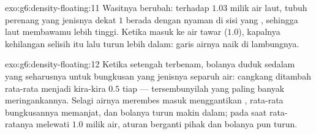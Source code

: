 \begin{solution}{exo:g6:density-floating:11}
Wasitnya berubah: terhadap $1.03$ milik air laut, tubuh perenang yang
 jenisnya dekat $1$ berada dengan nyaman di sisi yang ,
sehingga laut membawamu lebih tinggi. Ketika masuk ke air tawar
($1.0$), kapalnya kehilangan selisih itu lalu turun lebih dalam: garis
airnya naik di lambungnya.
\end{solution}

\begin{solution}{exo:g6:density-floating:12}
Ketika setengah terbenam, bolanya duduk sedalam yang seharusnya untuk
bungkusan yang  jenisnya separuh  air: cangkang
ditambah  rata-rata menjadi kira-kira $0.5$  tiap  ---  tersembunyilah yang paling banyak meringankannya.
Selagi airnya merembes masuk menggantikan , 
rata-rata bungkusannya memanjat, dan bolanya turun makin dalam; pada
saat rata-ratanya melewati $1.0$ milik air, aturan 
berganti pihak dan bolanya pun turun.
\end{solution}

